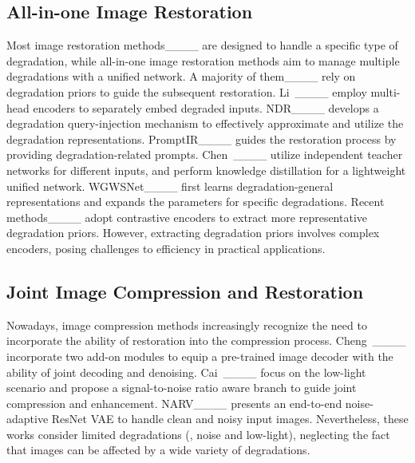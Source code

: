  \vspace{-0.05in}\subsection{All-in-one Image Restoration} \vspace{-0.05in}
Most image restoration methods____ are designed to handle a specific type of degradation, while all-in-one image restoration methods aim to manage multiple degradations with a unified network.  A majority of them____ rely on degradation priors to guide the subsequent restoration.  Li~\etal____ employ multi-head encoders to separately embed degraded inputs. NDR____ develops a degradation query-injection mechanism to effectively approximate and utilize the degradation representations. PromptIR____ guides the restoration process by providing degradation-related prompts. Chen~\etal____ utilize independent teacher networks for different inputs, and perform knowledge distillation for a lightweight unified network.  WGWSNet____ first learns degradation-general representations and expands the parameters for specific degradations.  Recent methods____ adopt contrastive encoders to extract more representative degradation priors.  However, extracting degradation priors involves complex encoders, posing challenges to efficiency in practical applications. 
 
 
 \vspace{-0.05in}\subsection{Joint Image Compression and Restoration} \vspace{-0.05in}
Nowadays, image compression methods increasingly recognize the need to incorporate the ability of restoration into the compression process. 
Cheng~\etal____ incorporate two add-on modules to equip a pre-trained image decoder with the ability of joint decoding and denoising. Cai~\etal____ focus on the low-light scenario and propose a signal-to-noise ratio aware branch to guide joint compression and enhancement.  NARV____ presents an end-to-end noise-adaptive ResNet VAE to handle clean and noisy input images. Nevertheless, these works consider limited degradations (\eg, noise and low-light), neglecting the fact that images can be affected by a wide variety of degradations.
 

 



